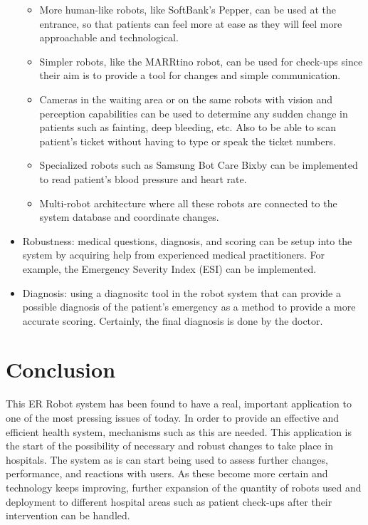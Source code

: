 \documentclass[letterpaper]{article}
\begin{document}
\begin{itemize}
\begin{itemize}
    \item More human-like robots, like SoftBank's Pepper, can be used at the entrance, so that patients can feel more at ease as they will feel more approachable and technological.
    
    \item Simpler robots, like the MARRtino robot, can be used for check-ups since their aim is to provide a tool for changes and simple communication.
    
    \item Cameras in the waiting area or on the same robots with vision and perception capabilities can be used to determine any sudden change in patients such as fainting, deep bleeding, etc. Also to be able to scan patient's ticket without having to type or speak the ticket numbers.
    
    \item Specialized robots such as Samsung Bot Care Bixby can be implemented to read patient's blood pressure and heart rate.
    
    \item Multi-robot architecture where all these robots are connected to the system database and coordinate changes.
    \end{itemize}
    
\item Robustness: medical questions, diagnosis, and scoring can be setup into the system by acquiring help from experienced medical practitioners. For example, the Emergency Severity Index (ESI) can be implemented. 

\item Diagnosis: using a diagnositc tool in the robot system that can provide a possible diagnosis of the patient's emergency as a method to provide a more accurate scoring. Certainly, the final diagnosis is done by the doctor.

\end{itemize}

\section{Conclusion}
This ER Robot system has been found to have a real, important application to one of the most pressing issues of today. In order to provide an effective and efficient health system, mechanisms such as this are needed. This application is the start of the possibility of necessary and robust changes to take place in hospitals. The system as is can start being used to assess further changes, performance, and reactions with users. As these become more certain and technology keeps improving, further expansion of the quantity of robots used and deployment to different hospital areas such as patient check-ups after their intervention can be handled.
\end{document}
